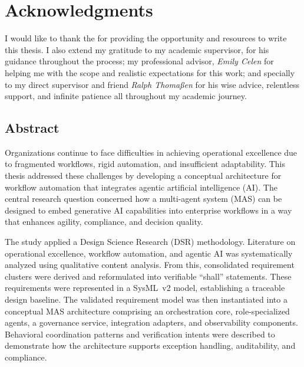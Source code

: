 \thispagestyle{empty}
\section*{Acknowledgments}
I would like to thank the \textit{\myCompany} for providing the opportunity and resources to write this thesis. 
I also extend my gratitude to my academic supervisor, \textit{\mySupervisor{}} for his guidance throughout the process; my professional advisor, \textit{Emily Celen} for helping me with the scope and realistic expectations for this work; and specially to my direct supervisor and friend \textit{Ralph Thomaßen} for his wise advice, relentless support, and infinite patience all throughout my academic journey.
\newpage

\begin{centering}
\section*{Abstract}
\end{centering}
Organizations continue to face difficulties in achieving operational excellence due to fragmented workflows, rigid automation, and insufficient adaptability. This thesis addressed these challenges by developing a conceptual architecture for workflow automation that integrates agentic artificial intelligence (AI). The central research question concerned how a multi-agent system (MAS) can be designed to embed generative AI capabilities into enterprise workflows in a way that enhances agility, compliance, and decision quality.

The study applied a Design Science Research (DSR) methodology. Literature on operational excellence, workflow automation, and agentic AI was systematically analyzed using qualitative content analysis. From this, consolidated requirement clusters were derived and reformulated into verifiable “shall” statements. These requirements were represented in a SysML~v2 model, establishing a traceable design baseline. The validated requirement model was then instantiated into a conceptual MAS architecture comprising an orchestration core, role-specialized agents, a governance service, integration adapters, and observability components. Behavioral coordination patterns and verification intents were described to demonstrate how the architecture supports exception handling, auditability, and compliance.

